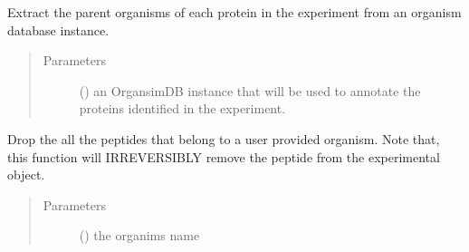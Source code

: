 \documentclass[letterpaper,10pt,english]{sphinxmanual}
\begin{document}
\begin{fulllineitems}
\begin{fulllineitems}
\end{fulllineitems}


\begin{fulllineitems}
\label{\detokenize{IPTK.Classes:IPTK.Classes.Experiment.Experiment.annotate_proteins}}
Extract the parent organisms of each protein in the experiment from an organism database instance.
\begin{quote}\begin{description}
\item[{Parameters}] \leavevmode
{} ({\hyperref[\detokenize{IPTK.Classes:IPTK.Classes.Database.OrganismDB}]{}}) \textendash{} an OrgansimDB instance that will be used to annotate the proteins          identified in the experiment.

\end{description}\end{quote}

\end{fulllineitems}


\begin{fulllineitems}
\label{\detokenize{IPTK.Classes:IPTK.Classes.Experiment.Experiment.drop_peptide_belong_to_org}}
Drop the all the peptides that belong to a user provided organism.              Note that, this function will IRREVERSIBLY remove the peptide from the experimental object.
\begin{quote}\begin{description}
\item[{Parameters}] \leavevmode
{} () \textendash{} the organims name


\end{description}
\end{quote}
\end{fulllineitems}
\end{fulllineitems}
\end{document}
